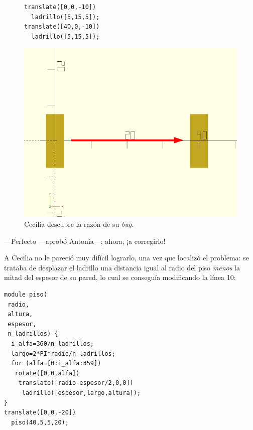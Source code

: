 \begin{figure}[ht]
  \begin{minipage}[]{.5\textwidth}
    \begin{lstlisting}
translate([0,0,-10])
  ladrillo([5,15,5]);
translate([40,0,-10])
  ladrillo([5,15,5]);
    \end{lstlisting}
  \end{minipage}\hfill
  \begin{minipage}[]{.5\textwidth}
      \centering
      \includegraphics[width=.8\textwidth]{imagenes/ladrillos-bug}
    \end{minipage}
    \caption{Cecilia descubre la razón de su \emph{bug}.}
  \label{fig:ladrillos-bug}
\end{figure}


---Perfecto ---aprobó Antonia---; ahora, ¡a corregirlo!

A Cecilia no le pareció muy difícil lograrlo, una vez que localizó el
problema: se trataba de desplazar el ladrillo una distancia igual al
radio del piso \emph{menos} la mitad del espesor de su pared, lo cual
se conseguía modificando la línea 10:

\begin{lstlisting}
module piso(
 radio,
 altura,
 espesor,
 n_ladrillos) {
  i_alfa=360/n_ladrillos;
  largo=2*PI*radio/n_ladrillos; 
  for (alfa=[0:i_alfa:359])
   rotate([0,0,alfa])
    translate([radio-espesor/2,0,0])
     ladrillo([espesor,largo,altura]); 
}
translate([0,0,-20])
  piso(40,5,5,20);
\end{lstlisting}


